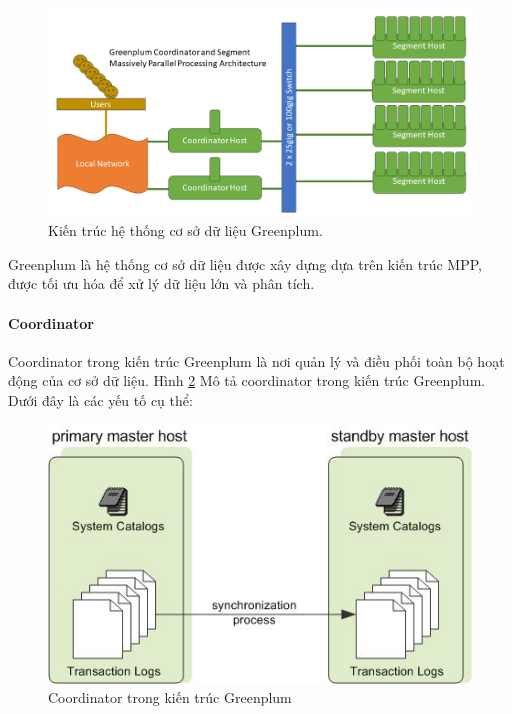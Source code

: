 \documentclass[14pt]{article}
\begin{document}
\begin{figure}[htbp]
\centerline{\includegraphics[scale=.4]{images/gp-architecture.png}}
\captionsetup{font=Large}
\caption{Kiến trúc hệ thống cơ sở dữ liệu Greenplum\protect\footnotemark.  }
\label{fig:gp-architecture}
\end{figure}


Greenplum là hệ thống cơ sở dữ liệu được xây dựng dựa trên kiến
trúc MPP, được tối ưu hóa để xử lý dữ liệu lớn và phân tích.


\paragraph{Coordinator}

Coordinator trong kiến trúc Greenplum là nơi quản lý và điều phối
toàn bộ hoạt động của cơ sở dữ liệu. Hình \ref{fig:admin_guide-graphics-standby_coordinator} Mô tả coordinator trong kiến trúc Greenplum.
Dưới đây là các yếu tố cụ thể:


\begin{figure}[htbp]
\centerline{\includegraphics[scale=.7]{images/admin_guide-graphics-standby_coordinator.jpg}}
\captionsetup{font=Large}
\caption{Coordinator trong kiến trúc Greenplum \protect\footnotemark}
\label{fig:admin_guide-graphics-standby_coordinator}
\end{figure}
\end{document}
